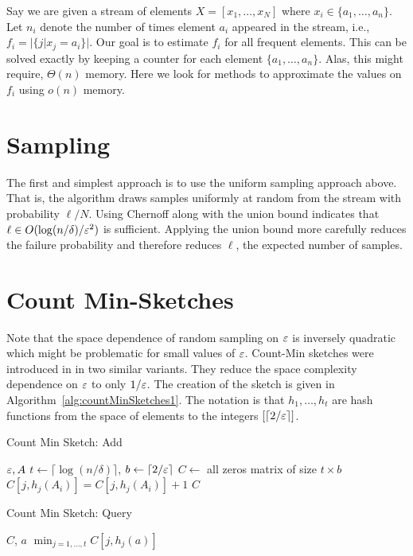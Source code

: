 \documentclass{article}
\begin{document}

Say we are given a stream of elements $X = [x_1,\ldots,x_N]$ where $x_i \in \{a_1,\ldots,a_n\}$.
Let $n_i$ denote the number of times element $a_i$ appeared in the stream, i.e., $f_i = |\{ j | x_j = a_i \}|$.
Our goal is to estimate $f_i$ for all frequent elements.
This can be solved exactly by keeping a counter for each element $\{a_1,\ldots,a_n\}$. 
Alas, this might require, $\Theta(n)$ memory. Here we look for methods to approximate the values on $f_i$ using $o(n)$ memory.

\section{Sampling}

The first and simplest approach is to use the uniform sampling approach above.
That is, the algorithm draws samples uniformly at random from the stream with probability $\ell /N$.
Using Chernoff along with the union bound 
indicates that $\ell \in O(\log(n/\delta)/\varepsilon^2)$ is sufficient.
Applying the union bound more carefully reduces the failure probability and therefore reduces $\ell$, 
the expected number of samples.



\section{Count Min-Sketches}
Note that the space dependence of random sampling on $\varepsilon$ is inversely quadratic which might be problematic for small values of $\varepsilon$. 
Count-Min sketches were introduced in \cite{CormodeM05}\cite{MankuM02} in two similar variants.
They reduce the space complexity dependence on $\varepsilon$ to only $1/\varepsilon$.
The creation of the sketch is given in Algorithm~\ref{alg:countMinSketches1}.
The notation is that $h_1,\ldots,h_t$ are hash functions from the space of elements to the integers $[\lceil 2/\varepsilon \rceil]$.
\begin{algorithm}
\caption{Count Min Sketch: Add}
\label{alg:countMinSketchesAdd}
\begin{algorithmic}
 $\varepsilon, A$ 
\STATE $t \leftarrow \lceil \log(n/\delta) \rceil$, $b \leftarrow \lceil 2/\varepsilon \rceil$
\STATE $C \leftarrow$ all zeros matrix of size $t \times b$
		\STATE $C[j,h_j(A_i)] = C[j,h_j(A_i)] + 1$
	\ENDFOR
\ENDFOR
{} $C$ 
\end{algorithmic}
\end{algorithm}
%
\begin{algorithm}
\caption{Count Min Sketch: Query}
\label{alg:countMinSketchesQuery}
\begin{algorithmic}
 $C$, $a$ 
 $\min_{j=1,\ldots,t} C[j,h_j(a)]$ 
\end{algorithmic}
\end{algorithm}
\end{document}
